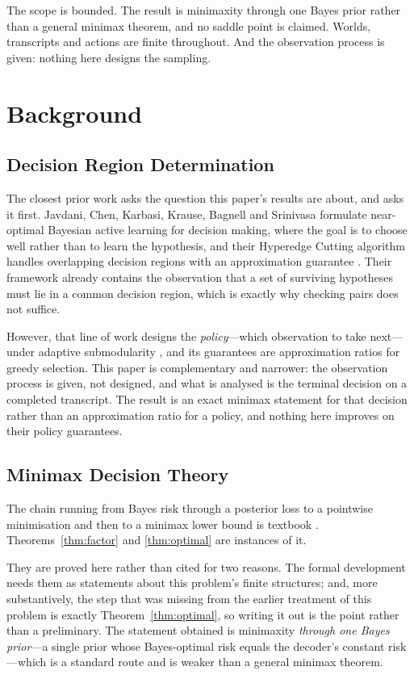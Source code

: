 \documentclass[conference]{IEEEtran}
\theoremstyle{definition}
\begin{document}
The scope is bounded. The result is minimaxity through one Bayes prior rather than a general
minimax theorem, and no saddle point is claimed. Worlds, transcripts and actions are finite
throughout. And the observation process is given: nothing here designs the sampling.

\section{Background}

\subsection{Decision Region Determination}

The closest prior work asks the question this paper's results are about, and asks it first.
Javdani, Chen,
Karbasi, Krause, Bagnell and Srinivasa formulate near-optimal Bayesian active learning for
decision making, where the goal is to choose well rather than to learn the hypothesis, and
their Hyperedge Cutting algorithm handles overlapping decision regions with an approximation
guarantee \cite{javdani2014}. Their framework already contains the observation that a set of
surviving hypotheses must lie in a common decision region, which is exactly why checking pairs
does not suffice.

However, that line of work designs the \emph{policy}---which observation to take next---under
adaptive submodularity \cite{golovin2011}, and its guarantees are approximation ratios for
greedy selection. This paper is complementary and narrower: the observation process is given,
not designed, and what is analysed is the terminal decision on a completed transcript. The
result is an exact minimax statement for that decision rather than an approximation ratio for
a policy, and nothing here improves on their policy guarantees.

\subsection{Minimax Decision Theory}

The chain running from Bayes risk through a posterior loss to a pointwise minimisation and
then to a minimax lower bound is textbook \cite{lehmann1998,wald1950}.
Theorems~\ref{thm:factor} and \ref{thm:optimal} are instances of it.

They are proved here rather than cited for two reasons. The formal development needs them as
statements about this problem's finite structures; and, more substantively, the step that was
missing from the earlier treatment of this problem is exactly
Theorem~\ref{thm:optimal}, so writing it out is the point rather than a preliminary. The
statement obtained is minimaxity \emph{through one Bayes prior}---a single prior whose
Bayes-optimal risk equals the decoder's constant risk---which is a standard route and is
weaker than a general minimax theorem.
\end{document}
